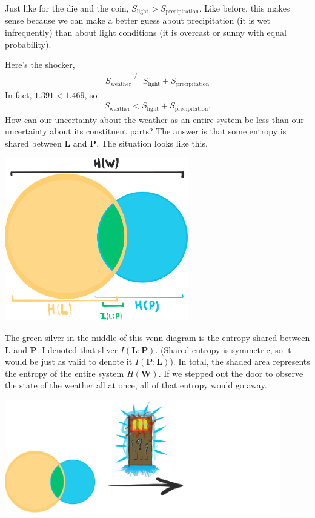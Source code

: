 Just like for the die and the coin, $S_{\text{light}} > S_{\text{precipitation}}$.
Like before, this makes sense because we can make a better guess about precipitation (it is wet infrequently) than about light conditions (it is overcast or sunny with equal probability).

Here's the shocker,
\begin{align*}
S_{\text{weather}}
\not{=}
S_{\text{light}} + S_{\text{precipitation}}
\end{align*}
In fact, $1.391 < 1.469$, so
\begin{align*}
S_{\text{weather}}
<
S_{\text{light}} + S_{\text{precipitation}}.
\end{align*}
How can our uncertainty about the weather as an entire system be less than our uncertainty about its constituent parts?
The answer is that some entropy is shared between $\bm{L}$ and $\bm{P}$.
The situation looks like this.
\begin{center}
  \includegraphics[trim= 0 0 0 0, clip, width=0.6\textwidth]{img/venn}
\end{center}
The green silver in the middle of this venn diagram is the entropy shared between $\bm{L}$ and $\bm{P}$.
I denoted that sliver $I( \bm{L} : \bm{P})$.
(Shared entropy is symmetric, so it would be just as valid to denote it $I( \bm{P} : \bm{L})$).
In total, the shaded area represents the entropy of the entire system $H(\bm{W})$.
If we stepped out the door to observe the state of the weather all at once, all of that entropy would go away.
\begin{center}
  \includegraphics[trim= 0 0 0 0, clip, width=0.9\textwidth]{img/mystery-door-peek}
\end{center}


